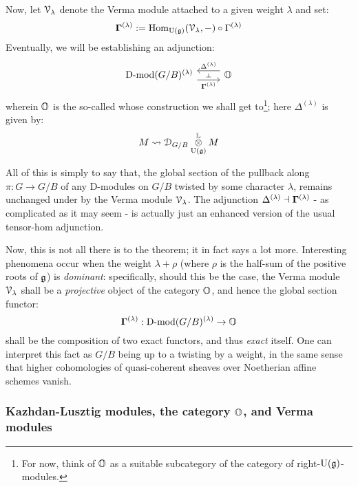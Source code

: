             Now, let $\mathcal{V}_{\lambda}$ denote the Verma module attached to a given weight $\lambda$ and set:
                $$\mathbf{\Gamma}^{(\lambda)} := \mathrm{Hom}_{\mathrm{U}(\mathfrak{g})}(\mathcal{V}_{\lambda}, -) \circ \Gamma^{(\lambda)}$$
            Eventually, we will be establishing an adjunction:
                $$
                    \begin{tikzcd}
                    	{\Dmod(G/B)^{(\lambda)}} & \O
                    	\arrow[""{name=0, anchor=center, inner sep=0}, "{\bfGamma^{(\lambda)}}"', shift right=2, from=1-1, to=1-2]
                    	\arrow[""{name=1, anchor=center, inner sep=0}, "{\Delta^{(\lambda)}}"', shift right=2, from=1-2, to=1-1]
                    	\arrow["\dashv"{anchor=center, rotate=-90}, draw=none, from=1, to=0]
                    \end{tikzcd}
                $$
            wherein $\mathbb{O}$ is the so-called  whose construction we shall get to\footnote{For now, think of $\mathbb{O}$ as a suitable subcategory of the category of right-$\mathrm{U}(\mathfrak{g})$-modules.}; here $\Delta^{(\lambda)}$ is given by:
                $$M \mapsto \D_{G/B} \tensor^{\L}_{\U(\g)} M$$
                
            All of this is simply to say that, the global section of the pullback along $\pi: G \to G/B$ of any D-modules on $G/B$ twisted by some character $\lambda$, remains unchanged under  by the Verma module $\mathcal{V}_{\lambda}$. The adjunction $\Delta^{(\lambda)} \dashv \mathbf{\Gamma}^{(\lambda)}$ - as complicated as it may seem - is actually just an enhanced version of the usual tensor-hom adjunction.
            
            Now, this is not all there is to the theorem; it in fact says a lot more. Interesting phenomena occur when the weight $\lambda + \rho$ (where $\rho$ is the half-sum of the positive roots of $\mathfrak{g}$) is \textit{dominant}: specifically, should this be the case, the Verma module $\mathcal{V}_{\lambda}$ shall be a \textit{projective} object of the category $\mathbb{O}$, and hence the  global section functor:
                $$\mathbf{\Gamma}^{(\lambda)}: \mathrm{D}\text{-}\mathrm{mod}(G/B)^{(\lambda)} \to \mathbb{O}$$
            shall be the composition of two exact functors, and thus \textit{exact} itself. One can interpret this fact as $G/B$ being  up to a twisting by a weight, in the same sense that higher cohomologies of quasi-coherent sheaves over Noetherian affine schemes vanish. 
                    
            \subsubsection{Kazhdan-Lusztig modules, the category \texorpdfstring{$\mathbb{O}$}{}, and Verma modules}
                    
